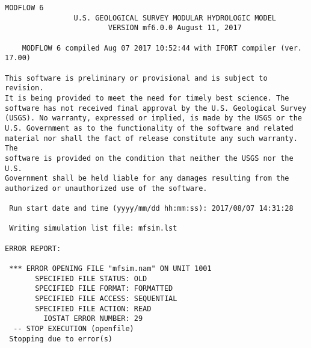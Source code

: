 {\small
\begin{lstlisting}[style=modeloutput]
                                   MODFLOW 6
                U.S. GEOLOGICAL SURVEY MODULAR HYDROLOGIC MODEL
                        VERSION mf6.0.0 August 11, 2017

    MODFLOW 6 compiled Aug 07 2017 10:52:44 with IFORT compiler (ver. 17.00)

This software is preliminary or provisional and is subject to revision.
It is being provided to meet the need for timely best science. The
software has not received final approval by the U.S. Geological Survey
(USGS). No warranty, expressed or implied, is made by the USGS or the
U.S. Government as to the functionality of the software and related
material nor shall the fact of release constitute any such warranty. The
software is provided on the condition that neither the USGS nor the U.S.
Government shall be held liable for any damages resulting from the
authorized or unauthorized use of the software.

 Run start date and time (yyyy/mm/dd hh:mm:ss): 2017/08/07 14:31:28

 Writing simulation list file: mfsim.lst

ERROR REPORT:

 *** ERROR OPENING FILE "mfsim.nam" ON UNIT 1001
       SPECIFIED FILE STATUS: OLD
       SPECIFIED FILE FORMAT: FORMATTED
       SPECIFIED FILE ACCESS: SEQUENTIAL
       SPECIFIED FILE ACTION: READ
         IOSTAT ERROR NUMBER: 29
  -- STOP EXECUTION (openfile)
 Stopping due to error(s)
\end{lstlisting}
}
